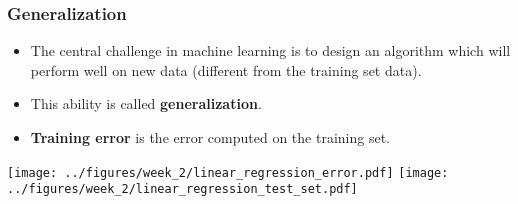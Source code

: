 \documentclass[notes]{beamer}          %
\newif\iffull
\begin{document}
\begin{frame}
\frametitle{Generalization}
    \begin{itemize}
        \item The central challenge in machine learning is to design an algorithm which will perform well on new data (different from the training set data).
        \item This ability is called {\bf generalization}.
        \item {\bf Training error} is the error computed on the training set.
        \iffull
        \item During the training (learning) we aim at reducing the training error.
        \item If that is the end goal, we only have an optimization problem, not a machine learning one.
        \fi
    \end{itemize}
    \begin{center}
            \iffull
            \texttt{[image: ../figures/week\_2/linear\_regression\_error.pdf]}
            \texttt{[image: ../figures/week\_2/linear\_regression\_test\_set.pdf]}
            \else
            \texttt{[image: ../figures/week\_2/linear\_regression\_error.pdf]}
            \texttt{[image: ../figures/week\_2/linear\_regression\_test\_set.pdf]}
            \fi
    \end{center}
\end{frame}

\iffull
\begin{frame}
\frametitle{Generalization error}
    \begin{itemize}
        \item {\bf Generalization error}, also called {\bf test error} is defined as the expected error on new, previously unseen data.
        \item Unlike in simple optimization, in machine learning our main goal is to minimize the {\bf generalization error}.
        \item Usually the generalization error is estimated by measuring the performance on a {\bf test data set} which must be independent from the training set.
    \end{itemize}
\end{frame}
\fi
\end{document}
